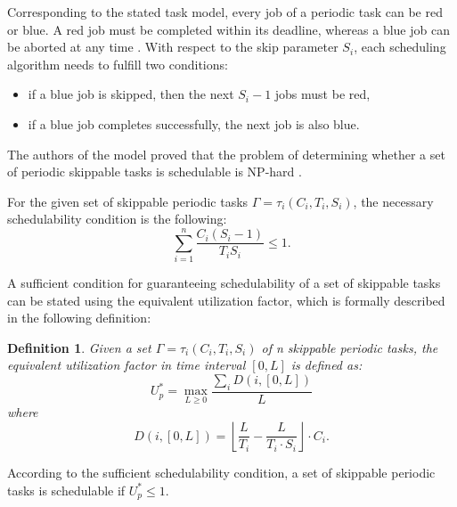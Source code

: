 Corresponding to the stated task model, every job of a periodic task can be red or blue.
A red job must be completed within its deadline, whereas a blue job can be aborted at any time 
\cite{buttazzo2011hard}. 
With respect to the skip parameter $S_i$, each scheduling algorithm needs to fulfill two conditions:
\begin{itemize}
	\item if a blue job is skipped, then the next \(S_i - 1\) jobs must be red,
	\item if a blue job completes successfully, the next job is also blue.
\end{itemize}
The authors of the model proved that the problem of determining whether a set of periodic skippable tasks is schedulable is NP-hard \cite{koren1995skip}.

For the given set of skippable periodic tasks \( \Gamma = {\tau_i(C_i,T_i,S_i)} \), the necessary schedulability condition is the following:
\begin{equation}
\sum_{i=1}^{n} \frac{C_i(S_i-1)}{T_i S_i} \leq 1.
\end{equation}

A sufficient condition for guaranteeing schedulability of a set of skippable tasks can be stated 
using the equivalent utilization factor, which is formally described in the following definition:
\newtheorem{mydef}{Definition}
\begin{mydef}
Given a set \( \Gamma = {\tau_i(C_i,T_i,S_i)} \) of n skippable periodic tasks, the equivalent utilization factor in time interval \([0,L]\) is defined as:
\begin{equation*}
U_p^\ast = \max_{L \geq 0} \frac{\sum_{i}D(i, [0,L])}{L}
\end{equation*}
where
\begin{equation*}
D(i, [0,L]) = \left\lfloor \frac{L}{T_i} - \frac{L}{T_i \cdot S_i}\right\rfloor \cdot C_i.
\end{equation*}
\end{mydef}

According to the sufficient schedulability condition, a set of skippable periodic tasks is schedulable if \( U_p^\ast \leq 1 \).


